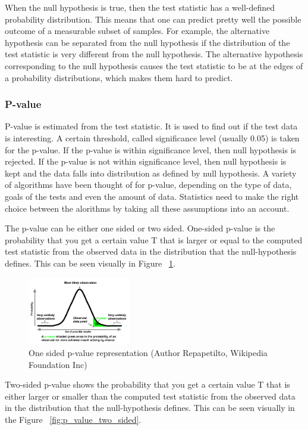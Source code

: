 \documentclass[12pt]{article}
\begin{document}
When the null hypothesis is true, then the test statistic has a well-defined probability distribution. This means that one can predict pretty well the possible outcome of a measurable subset of samples. For example, the alternative hypothesis can be separated from the null hypothesis if the distribution of the test statistic is very different from the null hypothesis. The alternative hypothesis corresponding to the null hypothesis causes the test statistic to be at the edges of a probability distributions, which makes them hard to predict.

\subsubsection{P-value}
P-value is estimated from the test statistic. It is used to find out if the test data is interesting. A certain threshold, called significance level (usually 0.05) is taken for the p-value. If the p-value is within significance level, then null hypothesis is rejected. If the p-value is not within significance level, then null hypothesis is kept and the data falls into distribution as defined by null hypothesis. A variety of algorithms have been thought of for p-value, depending on the type of data, goals of the tests and even the amount of data. Statistics need to make the right choice between the alorithms by taking all these assumptions into an account.

The p-value can be either one sided or two sided. One-sided p-value is the probability that you get a certain value T that is larger or equal to the computed test statistic from the observed data in the distribution that the null-hypothesis defines. This can be seen visually in Figure ~\ref{fig:p_value_one_sided}.

\begin{figure}[H]
  \centering
  \includegraphics[width=0.4\textwidth]{p_value_one_sided}
  \caption{One sided p-value representation (Author Repapetilto, Wikipedia Foundation Inc)}
  \label{fig:p_value_one_sided}
\end{figure}

Two-sided p-value shows the probability that you get a certain value T that is either larger or smaller than the computed test statistic from the observed data in the distribution that the null-hypothesis defines. This can be seen visually in the Figure ~\ref{fig:p_value_two_sided}.
\end{document}
